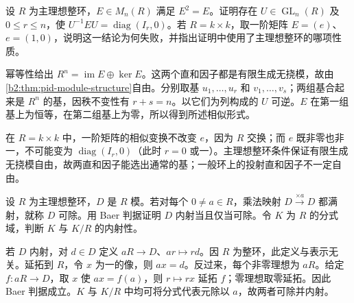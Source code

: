 \begin{exercise}\label{b2:ex:07-pid-finite-projective}
	设 \(R\) 为主理想整环，\(E\in M_n(R)\) 满足 \(E^2=E\)。证明存在 \(U\in\operatorname{GL}_n(R)\) 及 \(0\le r\le n\)，使 \(U^{-1}EU=\operatorname{diag}(I_r,0)\)。若 \(R=k\times k\)，取一阶矩阵 \(E=(e)\)、\(e=(1,0)\)，说明这一结论为何失败，并指出证明中使用了主理想整环的哪项性质。
\end{exercise}
\begin{solution}
	幂等性给出 \(R^n=\operatorname{im}E\oplus\ker E\)。这两个直和因子都是有限生成无挠模，故由\cref{b2:thm:pid-module-structure}自由。分别取基 \(u_1,\ldots,u_r\) 和 \(v_1,\ldots,v_s\)；两组基合起来是 \(R^n\) 的基，因秩不变性有 \(r+s=n\)。以它们为列构成的 \(U\) 可逆。\(E\) 在第一组基上为恒等，在第二组基上为零，所以得到所述相似形式。

	在 \(R=k\times k\) 中，一阶矩阵的相似变换不改变 \(e\)，因为 \(R\) 交换；而 \(e\) 既非零也非一，不可能变为 \(\operatorname{diag}(I_r,0)\)（此时 \(r=0\) 或一）。主理想整环条件保证有限生成无挠模自由，故两直和因子能选出通常的基；一般环上的投射直和因子不一定自由。
\end{solution}

\begin{exercise}\label{b2:ex:07-baer-pid}
	设 \(R\) 为主理想整环，\(D\) 是 \(R\) 模。若对每个 \(0\ne a\in R\)，乘法映射 \(D\xrightarrow{\times a}D\) 都满射，就称 \(D\) 可除。用 Baer 判据证明 \(D\) 内射当且仅当可除。令 \(K\) 为 \(R\) 的分式域，判断 \(K\) 与 \(K/R\) 的内射性。
\end{exercise}
\begin{solution}
	若 \(D\) 内射，对 \(d\in D\) 定义 \(aR\to D\)、\(ar\mapsto rd\)。因 \(R\) 为整环，此定义与表示无关。延拓到 \(R\)，令 \(x\) 为一的像，则 \(ax=d\)。反过来，每个非零理想为 \(aR\)。给定 \(f:aR\to D\)，取 \(x\) 使 \(ax=f(a)\)，则 \(r\mapsto rx\) 延拓 \(f\)；零理想取零延拓。因此 Baer 判据成立。\(K\) 与 \(K/R\) 中均可将分式代表元除以 \(a\)，故两者可除并内射。
\end{solution}

